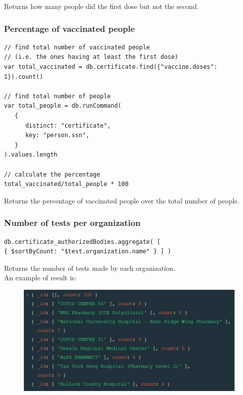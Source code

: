 \documentclass[12pt, a4paper]{article}
\begin{document}
\noindent 
Returns how many people did the first dose but not the second.

\subsubsection{Percentage of vaccinated people}
\begin{tcolorbox}[fontupper=\scriptsize]
    \begin{verbatim}
// find total number of vaccinated people 
// (i.e. the ones having at least the first dose)
var total_vaccinated = db.certificate.find({"vaccine.doses": 1}).count()

// find total number of people
var total_people = db.runCommand(
   {
      distinct: "certificate",
      key: "person.ssn",
   }
).values.length

// calculate the percentage
total_vaccinated/total_people * 100
    \end{verbatim}
\end{tcolorbox}

\noindent
Returns the percentage of vaccinated people over the total number of people.

\subsubsection{Number of tests per organization}
\begin{tcolorbox}[fontupper=\scriptsize]
    \begin{verbatim}
db.certificate_authorizedBodies.aggregate( [  
{ $sortByCount: "$test.organization.name" } ] )
    \end{verbatim}
\end{tcolorbox}

\noindent
Returns the number of tests made by each organization.\\
An example of result is:
\begin{figure}[ht]
    \centering
    \includegraphics[width=.9\linewidth]{tests_per_organization.jpg}
\end{figure}
\end{document}
